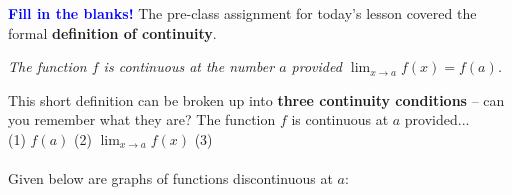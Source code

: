 \documentclass[10pt]{article}
\begin{document}
{\bf \textcolor{blue}{Fill in the blanks!}} The pre-class assignment for today's lesson covered the formal {\bf definition of continuity}. 
\begin{center}
{\it The function $f$ is continuous at the number $a$ provided $\displaystyle\lim_{x\to a} f(x)=f(a)$.} \\ %
\end{center}

\bigskip

This short definition can be broken up into {\bf three continuity conditions} -- can you remember what they are? The function $f$ is continuous at $a$ provided...  \\

(1) $f(a)$   \hfill
%
(2) $\displaystyle\lim_{x\to a}f(x)$ \hfill
%
(3)  \\[0.3in]

{\bf {}}\\
{} Given below are graphs of functions discontinuous at $a$:\\
\end{document}
